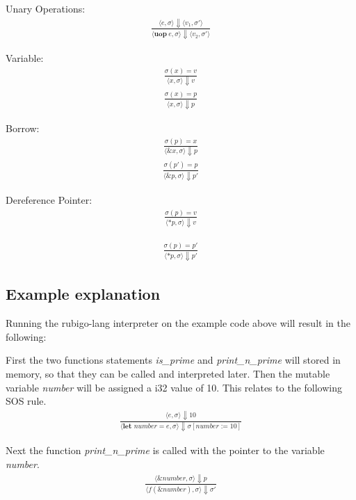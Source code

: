 \documentclass[12pt]{article}
\begin{document}
	Unary Operations:
	\begin{align*}
		\frac{\langle e, \sigma \rangle\Downarrow \langle v_1, \sigma' \rangle}
		{\langle \textbf{uop}\ e, \sigma \rangle\Downarrow \langle v_2, \sigma' \rangle}
	\end{align*}

	Variable:
	\begin{align*}
		\frac{\sigma(x) = v}
		{\langle x, \sigma \rangle\Downarrow v}
	\end{align*}
	\begin{align*}
		\frac{\sigma(x) = p}
		{\langle x, \sigma \rangle\Downarrow p}
	\end{align*}

	Borrow:
	\begin{align*}
		\frac{\sigma(p) = x}
		{\langle \&x, \sigma \rangle\Downarrow p}
	\end{align*}
	\begin{align*}
		\frac{\sigma(p') = p}
		{\langle \&p, \sigma \rangle\Downarrow p'}
	\end{align*}

	Dereference Pointer:
	\begin{align*}
		\frac{\sigma(p) = v}
		{\langle *p, \sigma \rangle\Downarrow v}
	\end{align*}

	\begin{align*}
		\frac{\sigma(p) = p'}
		{\langle *p, \sigma \rangle\Downarrow p'}
	\end{align*}	


    \subsection{Example explanation}
	Running the rubigo-lang interpreter on the example code above will result in the following:

	First the two functions statements \emph{is\_prime} and \emph{print\_n\_prime} will stored in memory, so that they can be called and interpreted later. Then the mutable variable \emph{number} will be assigned a i32 value of 10. This relates to the following SOS rule.
	\begin{align*}
		\frac{\langle e, \sigma \rangle\Downarrow 10}
		{\langle  \textbf{let } number = e, \sigma \rangle\Downarrow \sigma [number := 10]}
	\end{align*}

	Next the function \emph{print\_n\_prime} is called with the pointer to the variable \emph{number}.
	\begin{align*}
		\frac{\langle \&number, \sigma \rangle\Downarrow p}
		{\langle f(\&number), \sigma \rangle\Downarrow \sigma'}
	\end{align*}
\end{document}
